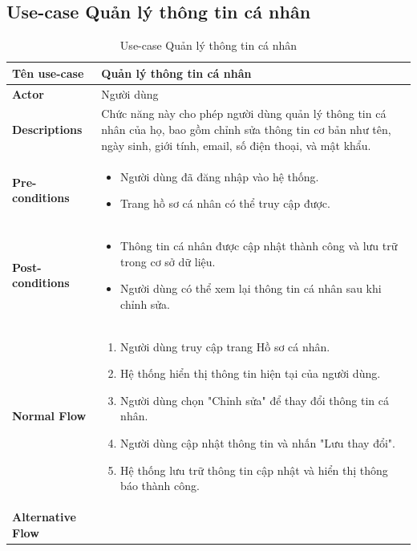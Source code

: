 \subsection{Use-case Quản lý thông tin cá nhân}

\begin{longtable}[H]{|l|p{}|}
    \caption{Use-case Quản lý thông tin cá nhân} \\
    \hline
    \textbf{Tên use-case} & Quản lý thông tin cá nhân \\
    \hline
    \textbf{Actor} & Người dùng \\
    \hline
    \textbf{Descriptions} & Chức năng này cho phép người dùng quản lý thông tin cá nhân của họ, bao gồm chỉnh sửa thông tin cơ bản như tên, ngày sinh, giới tính, email, số điện thoại, và mật khẩu. \\
    \hline
    \textbf{Pre-conditions} & 
    \begin{itemize}[leftmargin=4mm]
        \item Người dùng đã đăng nhập vào hệ thống.
        \item Trang hồ sơ cá nhân có thể truy cập được.
    \end{itemize} \\
    \hline
    \textbf{Post-conditions} & 
    \begin{itemize}[leftmargin=4mm]
        \item Thông tin cá nhân được cập nhật thành công và lưu trữ trong cơ sở dữ liệu.
        \item Người dùng có thể xem lại thông tin cá nhân sau khi chỉnh sửa.
    \end{itemize} \\
    \hline
    \textbf{Normal Flow} &  
    \begin{enumerate}[leftmargin=5.5mm]
        \item Người dùng truy cập trang Hồ sơ cá nhân.
        \item Hệ thống hiển thị thông tin hiện tại của người dùng.
        \item Người dùng chọn "Chỉnh sửa" để thay đổi thông tin cá nhân.
        \item Người dùng cập nhật thông tin và nhấn "Lưu thay đổi".
        \item Hệ thống lưu trữ thông tin cập nhật và hiển thị thông báo thành công.
    \end{enumerate} \\
    \hline
    \textbf{Alternative Flow} & 
    \begin{itemize}[leftmargin=4mm]

\end{itemize}
\end{longtable}
